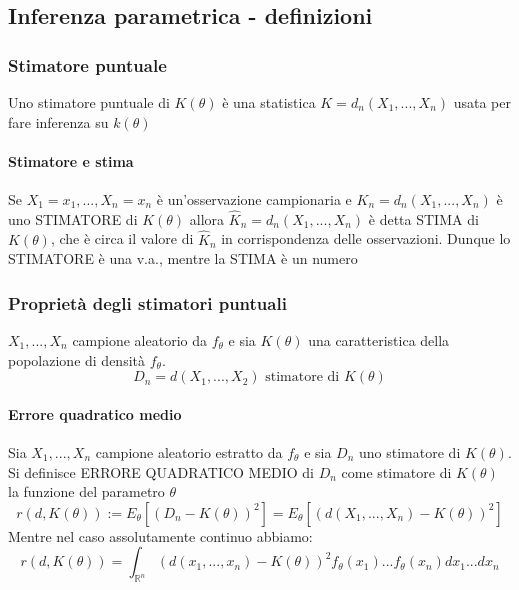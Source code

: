 \documentclass{article}
\begin{document}
	\newpage
	\subsection{Inferenza parametrica - definizioni}
	\subsubsection{Stimatore puntuale}
	Uno stimatore puntuale di $K(\theta)$ è una statistica $K = d_n(X_1,...,X_n)$ usata per fare inferenza su $k(\theta)$
	\paragraph{Stimatore e stima}
	Se $X_1=x_1,...,X_n=x_n$ è un'osservazione campionaria e $K_n = d_n(X_1,...,X_n)$ è uno STIMATORE di $K(\theta)$ allora $\widehat{K}_n = d_n(X_1,...,X_n)$ è detta STIMA di $K(\theta)$, che è circa il valore di $\widehat{K}_n$ in corrispondenza delle osservazioni. Dunque lo STIMATORE è una v.a., mentre la STIMA è un numero
	\subsubsection{Proprietà degli stimatori puntuali}
	$X_1,...,X_n$ campione aleatorio da $f_\theta$ e sia $K(\theta)$ una caratteristica della popolazione di densità $f_\theta$.
	\begin{equation}
		D_n = d(X_1,...,X_2) \text{ stimatore di } K(\theta)
	\end{equation}
	\paragraph{Errore quadratico medio}
	Sia $X_1,...,X_n$ campione aleatorio estratto da $f_\theta$ e sia $D_n$ uno stimatore di $K(\theta)$. Si definisce ERRORE QUADRATICO MEDIO di $D_n$ come stimatore di $K(\theta)$ la funzione del parametro $\theta$
	\begin{equation}
		r(d,K(\theta)):=E_\theta[(D_n-K(\theta))^2]=E_\theta[(d(X_1,...,X_n)-K(\theta))^2]
	\end{equation}
	Mentre nel caso assolutamente continuo abbiamo:
	\begin{equation}
		r(d,K(\theta)) = \int_{\mathbb{R}^n} (d(x_1,...,x_n) - K(\theta))^2 f_\theta(x_1)...f_\theta(x_n) dx_1 ... dx_n
	\end{equation}
\end{document}

